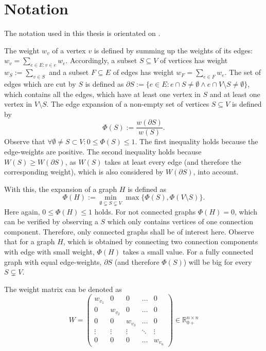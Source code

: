 \chapter{Notation}\label{chapter:notation}

The notation used in this thesis is orientated on \cite{ChanLTZ16}.



The weight $w_v$ of a vertex $v$ is defined by summing up the weights of its edges: $w_v = \sum_{e\in E: v\in e} w_e$. Accordingly, a subset $S\subseteq V$ of vertices has weight $w_S := \sum_{v\in S}$ and a subset $F \subseteq E $ of edges has weight $w_F = \sum_{e\in F} w_e$. The set of edges which are cut by $S$ is defined as $\partial S:= \{e\in E : e \cap S \neq \emptyset \land  e \cap V \setminus S \neq \emptyset  \}$, which contains all the edges, which have at least one vertex in $S$ and at least one vertex in $V\setminus S$. 
The edge expansion of a non-empty set of vertices $S \subseteq V$ is defined by \begin{equation}
\Phi(S):= \frac{w(\partial S)}{w(S)}.
\end{equation}
Observe that $\forall \emptyset \neq S \subset V : 0\le \Phi(S) \le 1 $. The first inequality holds because the edge-weights are positive. The second inequality holds because $W(S) \ge W(\partial S)$, as $W(S)$ takes at least every edge (and therefore the corresponding weight), which is also considered by $W(\partial S)$, into account.


With this, the expansion of a graph $H$ is defined as \begin{equation}
	\Phi(H) := \min_{\emptyset \subsetneq S \subsetneq V} \max \{\Phi(S), \Phi(V\setminus S)\}.
\end{equation} Here again, $0\le \Phi(H)\le 1$ holds.
For not connected graphs $\Phi(H) = 0$, which can be verified by observing a $S$ which only contains vertices of one connection component. Therefore, only connected graphs shall be of interest here.
Observe that for a graph $H$, which is obtained by connecting two connection components with edge with small weight, $\Phi(H)$ takes a small value. For a fully connected graph with equal edge-weights,  $\partial S$ (and therefore $\Phi(S)$) will be big for every $S\subsetneq V$.

The weight matrix can be denoted as $$ W = 
\begin{pmatrix}
w_{v_1} & 0 & 0&\dots &0 \\
0 & w_{v_2} & 0 & \ldots & 0 \\
0 & 0 & w_{v_3} & \ldots & 0 \\
\vdots & \vdots & \vdots & \ddots & \vdots \\
0 &0&0& \ldots  & w_{v_n}
\end{pmatrix} \in \mathbb{R}_{0+}^{n \times n} $$

